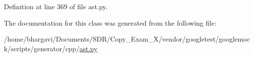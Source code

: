 Definition at line 369 of file ast.\+py.



The documentation for this class was generated from the following file\+:\begin{DoxyCompactItemize}
\item 
/home/bhargavi/\+Documents/\+S\+D\+R/\+Copy\+\_\+\+Exam\+\_\+X/vendor/googletest/googlemock/scripts/generator/cpp/\hyperlink{ast_8py}{ast.\+py}\end{DoxyCompactItemize}
